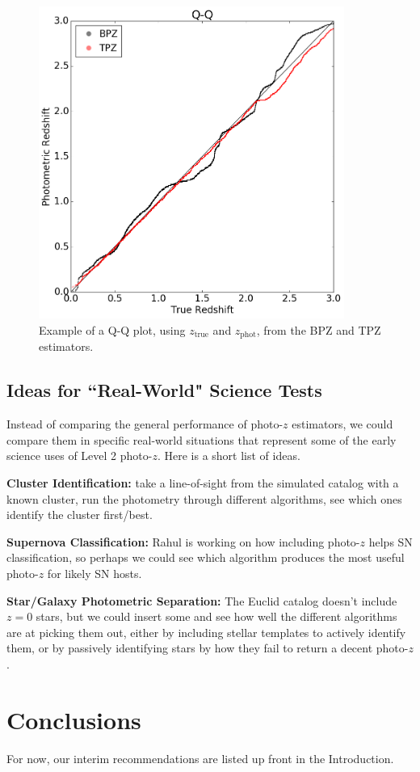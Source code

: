 \documentclass[DM,lsstdraft,toc]{lsstdoc}
\begin{document}
\begin{figure}
\begin{center}
\includegraphics[width=10cm]{figures/qq_BPZ_TPZ.png}
\caption{Example of a Q-Q plot, using $z_\mathrm{true}$ and $z_\mathrm{phot}$, from the BPZ and TPZ estimators.}\label{fig:qq}
\end{center}
\end{figure}


\subsection{Ideas for ``Real-World" Science Tests}\label{ssec:more}

Instead of comparing the general performance of photo-$z$ estimators, we could compare them in specific real-world situations that represent some of the early science uses of Level 2 photo-$z$. Here is a short list of ideas.

\textbf{Cluster Identification:} take a line-of-sight from the simulated catalog with a known cluster, run the photometry through different algorithms, see which ones identify the cluster first/best.

\textbf{Supernova Classification:} Rahul is working on how including photo-$z$ helps SN classification, so perhaps we could see which algorithm produces the most useful photo-$z$ for likely SN hosts.

\textbf{Star/Galaxy Photometric Separation:} The Euclid catalog doesn't include $z=0$ stars, but we could insert some and see how well the different algorithms are at picking them out, either by including stellar templates to actively identify them, or by passively identifying stars by how they fail to return a decent photo-$z$.

\section{Conclusions}

For now, our interim recommendations are listed up front in the Introduction.


\end{document}
